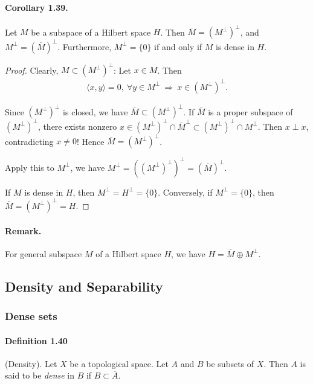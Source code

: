 \documentclass{article}
\begin{document}
\paragraph{Corollary 1.39.\label{cor:1.39}} Let $M$ be a subspace of a Hilbert space $H$. Then $\overline{M} = \left(M^\perp\right)^\perp$, and $M^\perp=\left(\overline{M}\right)^\perp$. Furthermore, $M^\perp=\{0\}$ if and only if $M$ is dense in $H$.
\begin{proof}
Clearly, $M\subset\left(M^\perp\right)^\perp$: Let $x\in M$. Then
\begin{align*}
	\langle x,y\rangle = 0,\ \forall y\in M^\perp\ \Rightarrow\ x\in \left(M^\perp\right)^\perp.
\end{align*}

Since $\left(M^\perp\right)^\perp$ is closed, we have $\overline{M}\subset\left(M^\perp\right)^\perp$. If $\overline{M}$ is a proper subspace of $\left(M^\perp\right)^\perp$, there exists nonzero $x\in \left(M^\perp\right)^\perp\cap\overline{M}^\perp\subset\left(M^\perp\right)^\perp\cap M^\perp$. Then $x\perp x$, contradicting $x\neq 0$! Hence $\overline{M} = \left(M^\perp\right)^\perp$. 

Apply this to $M^\perp$, we have $M^\perp = \left((M^\perp)^\perp\right)^\perp = \left(\overline{M}\right)^\perp$.

If $M$ is dense in $H$, then $M^\perp = H^\perp = \{0\}$. Conversely, if $M^\perp = \{0\}$, then $\overline{M}=\left(M^\perp\right)^\perp = H$.
\end{proof}

\paragraph{Remark.} For general subspace $M$ of a Hilbert space $H$, we have $H=\overline{M}\oplus M^\perp$.

\newpage
\subsection{Density and Separability}
\subsubsection{Dense sets}
\paragraph{Definition 1.40\label{def:1.40}} (Density). Let $X$ be a topological space. Let $A$ and $B$ be subsets of $X$. Then $A$ is said to be \textit{dense} in $B$ if $B\subset\overline{A}$.
\end{document}
